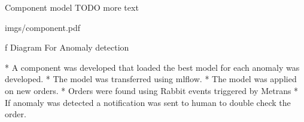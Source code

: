 
\sec Component model
TODO more text

\medskip
{}
\picw=14cm \cinspic imgs/component.pdf
\caption/f Diagram For Anomaly detection
\medskip

\begitems
* A component was developed that loaded the best model for each anomaly was developed.
* The model was transferred using mlflow.
* The model was applied on new orders.
* Orders were found using Rabbit events triggered by Metrans
* If anomaly was detected a notification was sent to human to double check the order.
\enditems
